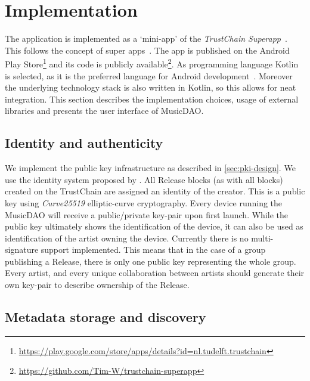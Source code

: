 \chapter{Implementation}
The application is implemented as a `mini-app' of the \textit{TrustChain Superapp}~\citep{mattskala2020}. This follows the concept of super apps~\citep{kpmg2019superapps}. The app is published on the Android Play Store\footnote{\url{https://play.google.com/store/apps/details?id=nl.tudelft.trustchain}} and its code is publicly available\footnote{\url{https://github.com/Tim-W/trustchain-superapp}}. As programming language Kotlin is selected, as it is the preferred language for Android development~\citep{googleio2019}. Moreover the underlying technology stack is also written in Kotlin, so this allows for neat integration. This section describes the implementation choices, usage of external libraries and presents the user interface of MusicDAO.

\section{Identity and authenticity}
We implement the public key infrastructure as described in \ref{sec:pki-design}. We use the identity system proposed by \cite{mattskala2020}. All Release blocks (as with all blocks) created on the TrustChain are assigned an identity of the creator. This is a public key using \textit{Curve25519} elliptic-curve cryptography. Every device running the MusicDAO will receive a public/private key-pair upon first launch. While the public key ultimately shows the identification of the device, it can also be used as identification of the artist owning the device. Currently there is no multi-signature support implemented. This means that in the case of a group publishing a Release, there is only one public key representing the whole group. Every artist, and every unique collaboration between artists should generate their own key-pair to describe ownership of the Release.

\section{Metadata storage and discovery}
